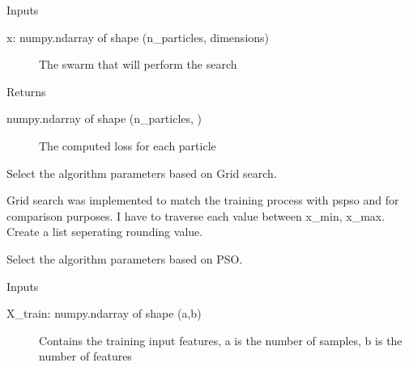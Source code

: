 \documentclass[letterpaper,10pt,english]{sphinxmanual}
\begin{document}
\begin{fulllineitems}
\begin{fulllineitems}
Inputs
\begin{description}
\item[{x: numpy.ndarray of shape (n\_particles, dimensions)}] \leavevmode
The swarm that will perform the search

\end{description}

Returns
\begin{description}
\item[{numpy.ndarray of shape (n\_particles, )}] \leavevmode
The computed loss for each particle

\end{description}

\end{fulllineitems}


\begin{fulllineitems}
\label{\detokenize{index:pspso.pspso.fitpsgrid}}
Select the algorithm parameters based on Grid search.

Grid search was implemented to match the training process with pspso and for comparison purposes.
I have to traverse each value between x\_min, x\_max. Create a list seperating rounding value.

\end{fulllineitems}


\begin{fulllineitems}
\label{\detokenize{index:pspso.pspso.fitpspso}}
Select the algorithm parameters based on PSO.

Inputs
\begin{description}
\item[{X\_train: numpy.ndarray of shape (a,b)}] \leavevmode
Contains the training input features, a is the number of samples, b is the number of features


\end{description}
\end{fulllineitems}
\end{fulllineitems}
\end{document}
